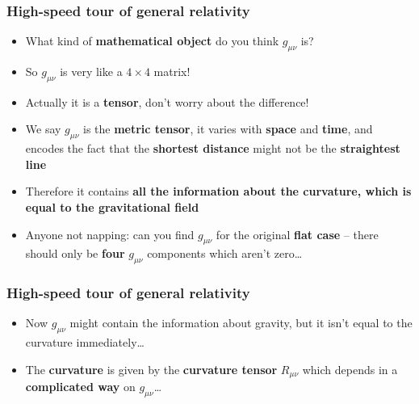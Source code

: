 \documentclass{beamer}
\begin{document}
\begin{frame}
  \frametitle{High-speed tour of general relativity}
  \begin{itemize}
    \item<1-> What kind of \textbf{mathematical object} do you think $g_{\mu\nu}$ is?
    \item<2-> So $g_{\mu\nu}$ is very like a $4\times 4$ matrix!
    \item<3-> Actually it is a \textbf{tensor}, don't worry about the difference!
    \item<4-> We say $g_{\mu\nu}$ is the \textbf{metric tensor}, it varies with \textbf{space} and \textbf{time}, and encodes the fact that the \textbf{shortest distance} might not be the \textbf{straightest line}
    \item<5-> Therefore it contains \textbf{all the information about the curvature, which is equal to the gravitational field}
    \item<6-> Anyone not napping: can you find $g_{\mu\nu}$ for the original \textbf{flat case} -- there should only be \textbf{four} $g_{\mu\nu}$ components which aren't zero\ldots
  \end{itemize}
\end{frame}

\begin{frame}
  \frametitle{High-speed tour of general relativity}
  \begin{itemize}
    \item<1-> Now $g_{\mu\nu}$ might contain the information about gravity, but it isn't equal to the curvature immediately\ldots
    \item<2-> The \textbf{curvature} is given by the \textbf{curvature tensor} $R_{\mu\nu}$ which depends in a \textbf{complicated way} on $g_{\mu\nu}$\ldots
  \end{itemize}
\end{frame}
\end{document}
